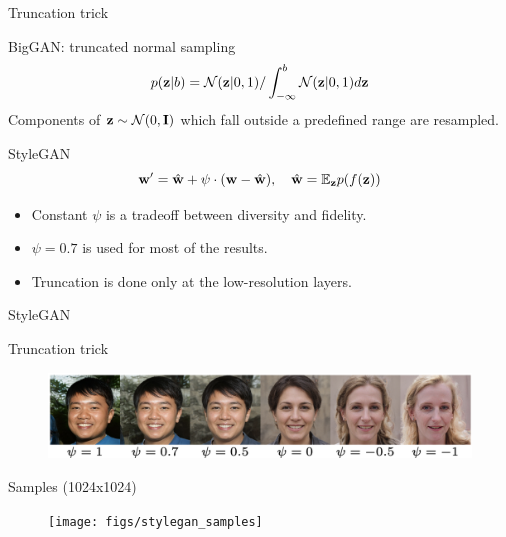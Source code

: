 \begin{frame}{Truncation trick}
	\begin{block}{BigGAN: truncated normal sampling}
		\vspace{-0.3cm}
		\[
			p(\mathbf{z} | b) = \mathcal{N}(\mathbf{z} | 0, 1) / \int_{-\infty}^b \mathcal{N}(\mathbf{z} | 0, 1) d\mathbf{z}
		\]
		Components of $\mathbf{z} \sim \mathcal{N}(0, \mathbf{I})$ which fall outside a predefined range are resampled.
	\end{block}
	
	\begin{block}{StyleGAN}
		\vspace{-0.2cm}
		\[
			\mathbf{w}' = \hat{\mathbf{w}} + \psi \cdot (\mathbf{w} - \hat{\mathbf{w}}), \quad \hat{\mathbf{w}} = \mathbb{E}_{\mathbf{z}} p(f(\mathbf{z}))
		\]
		\vspace{-0.2cm}
		\begin{itemize}
			\item Constant $\psi$ is a tradeoff between diversity and fidelity. 
			\item $\psi=0.7$ is used for most of the results.
			\item Truncation is done only at the low-resolution layers.
		\end{itemize}
	\end{block}

\end{frame}
\begin{frame}{StyleGAN}
	\begin{block}{Truncation trick}
		\begin{figure}
			\centering
			\includegraphics[width=0.85\linewidth]{figs/stylegan_truncation}
		\end{figure}
		\vspace{-0.4cm}
	\end{block}
	\begin{block}{Samples (1024x1024)}
		\begin{figure}
			\centering
			\texttt{[image: figs/stylegan\_samples]}
		\end{figure}
	\end{block}

\end{frame}

